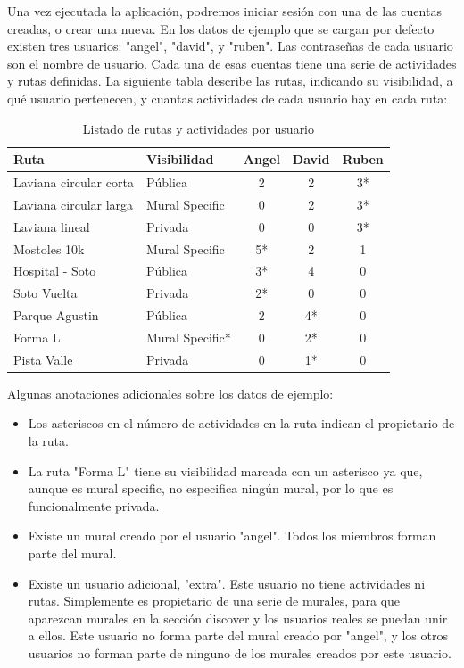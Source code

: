 Una vez ejecutada la aplicación, podremos iniciar sesión con una de las cuentas creadas, o crear una nueva. En los datos de ejemplo que se cargan por defecto existen tres usuarios: "angel", "david", y "ruben". Las contraseñas de cada usuario son el nombre de usuario. Cada una de esas cuentas tiene una serie de actividades y rutas definidas. La siguiente tabla describe las rutas, indicando su visibilidad, a qué usuario pertenecen, y cuantas actividades de cada usuario hay en cada ruta:
\begin{table}[H]
\centering
\begin{tabular}{l l c c c}
\hline
\textbf{Ruta} & \textbf{Visibilidad} & \textbf{Angel} & \textbf{David} & \textbf{Ruben} \\
\hline
Laviana circular corta & Pública & 2 & 2 & 3* \\
Laviana circular larga & Mural Specific & 0 & 2 & 3* \\
Laviana lineal & Privada & 0 & 0 & 3* \\
Mostoles 10k & Mural Specific & 5* & 2 & 1 \\
Hospital - Soto & Pública & 3* & 4 & 0 \\
Soto Vuelta & Privada & 2* & 0 & 0 \\
Parque Agustin & Pública & 2 & 4* & 0 \\
Forma L & Mural Specific* & 0 & 2* & 0 \\
Pista Valle & Privada & 0 & 1* & 0 \\
\hline
\end{tabular}
\caption{Listado de rutas y actividades por usuario}
\end{table}
Algunas anotaciones adicionales sobre los datos de ejemplo:
\begin{itemize}
    \item Los asteriscos en el número de actividades en la ruta indican el propietario de la ruta.
    \item La ruta "Forma L" tiene su visibilidad marcada con un asterisco ya que, aunque es mural specific, no especifica ningún mural, por lo que es funcionalmente privada.
    \item Existe un mural creado por el usuario "angel". Todos los miembros forman parte del mural.
    \item Existe un usuario adicional, "extra". Este usuario no tiene actividades ni rutas. Simplemente es propietario de una serie de murales, para que aparezcan murales en la sección discover y los usuarios reales se puedan unir a ellos. Este usuario no forma parte del mural creado por "angel", y los otros usuarios no forman parte de ninguno de los murales creados por este usuario.
\end{itemize}

